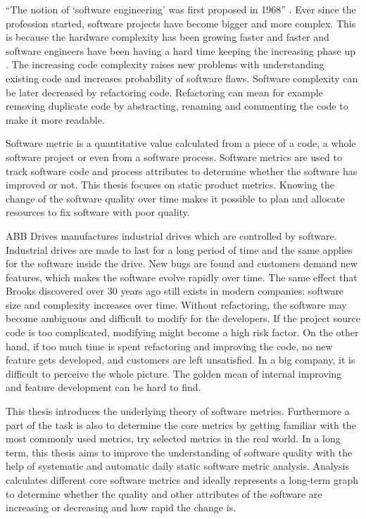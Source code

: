 “The notion of ‘software engineering’ was first proposed in 1968” \cite{sommerville2011software}. Ever since the profession started, software projects have become bigger and more complex. This is because the hardware complexity has been growing faster and faster and software engineers have been having a hard time keeping the increasing phase up \cite{brooks1987no}. The increasing code complexity raises new problems with understanding existing code and increases probability of software flaws. Software complexity can be later decreased by refactoring code. Refactoring can mean for example removing duplicate code by abstracting, renaming and commenting the code to make it more readable.

Software metric is a quantitative value calculated from a piece of a code, a whole software project or even from a software process. Software metrics are used to track software code and process attributes to determine whether the software has improved or not. This thesis focuses on static product metrics. Knowing the change of the software quality over time makes it possible to plan and allocate resources to fix software with poor quality.

ABB Drives manufactures industrial drives which are controlled by software. Industrial drives are made to last for a long period of time and the same applies for the software inside the drive. New bugs are found and customers demand new features, which makes the software evolve rapidly over time. The same effect that Brooks discovered over 30 years ago still exists in modern companies: software size and complexity increases over time. Without refactoring, the software may become ambiguous and difficult to modify for the developers. If the project source code is too complicated, modifying might become a high risk factor. On the other hand, if too much time is spent refactoring and improving the code, no new feature gets developed, and customers are left unsatisfied. In a big company, it is difficult to perceive the whole picture. The golden mean of internal improving and feature development can be hard to find.

This thesis introduces the underlying theory of software metrics. Furthermore a part of the task is also to determine the core metrics by getting familiar with the most commonly used metrics, try selected metrics in the real world. In a long term, this thesis aims to improve the understanding of software quality with the help of systematic and automatic daily static software metric analysis.  Analysis calculates different core software metrics and ideally represents a long-term graph to determine whether the quality and other attributes of the software are increasing or decreasing and how rapid the change is.

